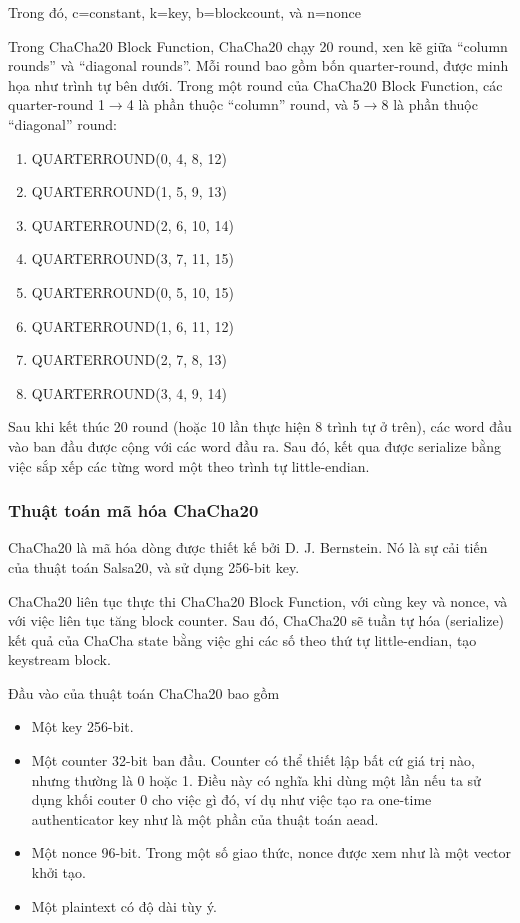 Trong đó, c=constant, k=key, b=blockcount, và n=nonce

Trong ChaCha20 Block Function, ChaCha20 chạy 20 round, xen kẽ giữa ``column rounds'' và ``diagonal rounds''. Mỗi round bao gồm bốn quarter-round, được minh họa như trình tự bên dưới. Trong một round của ChaCha20 Block Function, các quarter-round 1$\rightarrow$4 là phần thuộc ``column'' round, và 5$\rightarrow$8 là phần thuộc ``diagonal'' round:

\begin{enumerate}
    \item QUARTERROUND(0, 4, 8, 12)
    \item QUARTERROUND(1, 5, 9, 13)
    \item QUARTERROUND(2, 6, 10, 14)
    \item QUARTERROUND(3, 7, 11, 15)
    \item QUARTERROUND(0, 5, 10, 15)
    \item QUARTERROUND(1, 6, 11, 12)
    \item QUARTERROUND(2, 7, 8, 13)
    \item QUARTERROUND(3, 4, 9, 14)
\end{enumerate}

Sau khi kết thúc 20 round (hoặc 10 lần thực hiện 8 trình tự ở trên), các word đầu vào ban đầu được cộng với các word đầu ra. Sau đó, kết qua được serialize bằng việc sắp xếp các từng word một theo trình tự little-endian.

\subsubsection{Thuật toán mã hóa ChaCha20}

ChaCha20 là mã hóa dòng được thiết kế bởi D. J. Bernstein. Nó là sự cải tiến của thuật toán Salsa20, và sử dụng 256-bit key.

ChaCha20 liên tục thực thi ChaCha20 Block Function, với cùng key và nonce, và với việc liên tục tăng block counter. Sau đó, ChaCha20 sẽ tuần tự hóa (serialize) kết quả của ChaCha state bằng việc ghi các số theo thứ tự little-endian, tạo keystream block.

Đầu vào của thuật toán ChaCha20 bao gồm
\begin{itemize}
    \item Một key 256-bit.
    \item Một counter 32-bit ban đầu. Counter có thể thiết lập bất cứ giá trị nào, nhưng thường là 0 hoặc 1. Điều này có nghĩa khi dùng một lần nếu ta sử dụng khối couter 0 cho việc gì đó, ví dụ như việc tạo ra one-time authenticator key như là một phần của thuật toán \acrshort{aead}.
    \item Một nonce 96-bit. Trong một số giao thức, nonce được xem như là một vector khởi tạo.
    \item Một plaintext có độ dài tùy ý.
\end{itemize}

